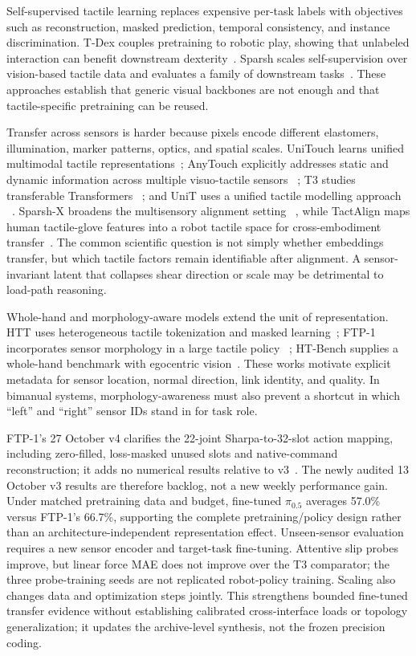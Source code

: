 Self-supervised tactile learning replaces expensive per-task labels with
objectives such as reconstruction, masked prediction, temporal consistency, and
instance discrimination. T-Dex couples pretraining to robotic play, showing that
unlabeled interaction can benefit downstream dexterity~\cite{guzey2023tdex}.
Sparsh scales self-supervision over vision-based tactile data and evaluates a
family of downstream tasks~\cite{higuera2025sparsh}. These approaches establish
that generic visual backbones are not enough and that tactile-specific pretraining
can be reused.

Transfer across sensors is harder because pixels encode different elastomers,
illumination, marker patterns, optics, and spatial scales. UniTouch learns unified
multimodal tactile representations~\cite{yang2024unitouch}; AnyTouch explicitly
addresses static and dynamic information across multiple visuo-tactile sensors
~\cite{feng2025anytouch}; T3 studies transferable Transformers
~\cite{zhao2024t3}; and UniT uses a unified tactile modelling approach
~\cite{xu2024unit}. Sparsh-X broadens the multisensory alignment setting
~\cite{higuera2025sparshx}, while TactAlign maps human tactile-glove features into
a robot tactile space for cross-embodiment transfer~\cite{tactalign2026}. The
common scientific question is not simply whether
embeddings transfer, but which tactile factors remain identifiable after
alignment. A sensor-invariant latent that collapses shear direction or scale may
be detrimental to load-path reasoning.

Whole-hand and morphology-aware models extend the unit of representation. HTT
uses heterogeneous tactile tokenization and masked learning~\cite{bi2026htt};
FTP-1 incorporates sensor morphology in a large tactile policy
~\cite{yuan2026ftp1}; HT-Bench supplies a whole-hand benchmark with egocentric
vision~\cite{huang2026htbench}. These works motivate explicit metadata for sensor
location, normal direction, link identity, and quality. In bimanual systems,
morphology-awareness must also prevent a shortcut in which ``left'' and ``right''
sensor IDs stand in for task role.

FTP-1's 27 October v4 clarifies the 22-joint Sharpa-to-32-slot action mapping,
including zero-filled, loss-masked unused slots and native-command reconstruction;
it adds no numerical results relative to v3~\cite{yuan2026ftp1}. The newly audited
13 October v3 results are therefore backlog, not a new weekly performance gain.
Under matched pretraining data and budget, fine-tuned $\pi_{0.5}$ averages
57.0\% versus FTP-1's 66.7\%, supporting the complete pretraining/policy design
rather than an architecture-independent representation effect. Unseen-sensor
evaluation requires a new sensor encoder and target-task fine-tuning. Attentive
slip probes improve, but linear force MAE does not improve over the T3 comparator;
the three probe-training seeds are not replicated robot-policy training.
Scaling also changes data and optimization steps jointly. This strengthens
bounded fine-tuned transfer evidence without establishing calibrated
cross-interface loads or topology generalization; it updates the archive-level
synthesis, not the frozen precision coding.

